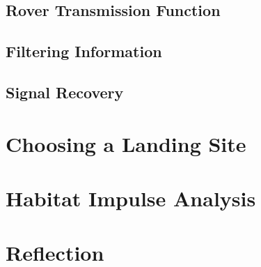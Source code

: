 \documentclass[a4paper]{article}
\begin{document}
\subsection*{Rover Transmission Function}
\subsection*{Filtering Information}
\subsection*{Signal Recovery}

\section{Choosing a Landing Site}
\section{Habitat Impulse Analysis}
\section{Reflection}
\end{document}
